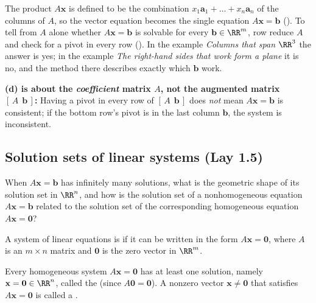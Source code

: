 \documentclass[10pt]{scrartcl}
\newcommand{\vv}[1]{\mathbf{#1}}
\begin{document}
\revisit
The product $A\vv x$ is defined to be the combination $x_1\vv a_1+\dots+x_n\vv a_n$ of the columns of $A$, so the vector equation becomes the single equation $A\vv x=\vv b$ (). To tell from $A$ alone whether $A\vv x=\vv b$ is solvable for every $\vv b\in\RR^m$, row reduce $A$ and check for a pivot in every row (). In the example \emph{Columns that span $\RR^3$} the answer is yes; in the example \emph{The right-hand sides that work form a plane} it is no, and the method there describes exactly which $\vv b$ work.

\begin{trapbox}
  \ii \textbf{(d) is about the \emph{coefficient} matrix $A$, not the augmented matrix $[\,A\ \ \vv b\,]$:} Having a pivot in every row of $[\,A\ \ \vv b\,]$ does \emph{not} mean $A\vv x=\vv b$ is consistent; if the bottom row's pivot is in the last column $\vv b$, the system is inconsistent.
\end{trapbox}

\subsection{Solution sets of linear systems (Lay 1.5)}

\begin{qbox}
  When $A\vv x=\vv b$ has infinitely many solutions, what is the geometric shape of its solution set in $\RR^n$, and how is the solution set of a nonhomogeneous equation $A\vv x=\vv b$ related to the solution set of the corresponding homogeneous equation $A\vv x=\vv 0$?
\end{qbox}

\begin{definition*}
  A system of linear equations is  if it can be written in the form $A\vv x=\vv 0$, where $A$ is an $m\times n$ matrix and $\vv 0$ is the zero vector in $\RR^m$.
  \begin{itemize}
    \ii Every homogeneous system $A\vv x=\vv 0$ has at least one solution, namely $\vv x=\vv 0\in\RR^n$, called the  (since $A\vv 0=\vv 0$).
    \ii A nonzero vector $\vv x\ne\vv 0$ that satisfies $A\vv x=\vv 0$ is called a .
  \end{itemize}
\end{definition*}
\end{document}
